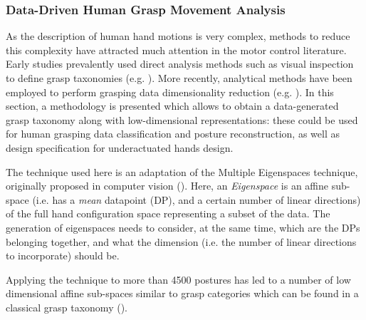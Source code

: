 
\subsubsection{Data-Driven Human Grasp Movement Analysis}
\label{sec:DataDrivenMovementAnalysis}

As the description of human hand motions is very complex, methods to reduce this complexity have attracted much attention in the motor control literature.
Early studies prevalently used direct analysis methods such as visual inspection to define grasp taxonomies (e.g. \cite{cutkosky1989grasp}).
More recently, analytical methods have been employed to perform grasping data dimensionality reduction (e.g. \cite{santello1998postural}).
In this section, a methodology is presented which allows to obtain a data-generated grasp taxonomy along with low-dimensional representations: these could be used for human grasping data classification and posture reconstruction, as well as design specification for underactuated hands design.

The technique used here is an adaptation of the Multiple Eigenspaces technique, originally proposed in computer vision (\cite{leonardis2002multiple}).
Here, an \emph{Eigenspace} is an affine sub-space (i.e. has a \emph{mean} datapoint (DP), and a certain number of linear directions) of the full hand configuration space representing a subset of the data.
The generation of eigenspaces needs to consider, at the same time, which are the DPs belonging together, and what the dimension (i.e. the number of linear directions to incorporate) should be.


Applying the technique to more than 4500 postures has led to a number of low dimensional affine sub-spaces similar to grasp categories which can be found in a classical grasp taxonomy (\cite{cutkosky1989grasp}).

